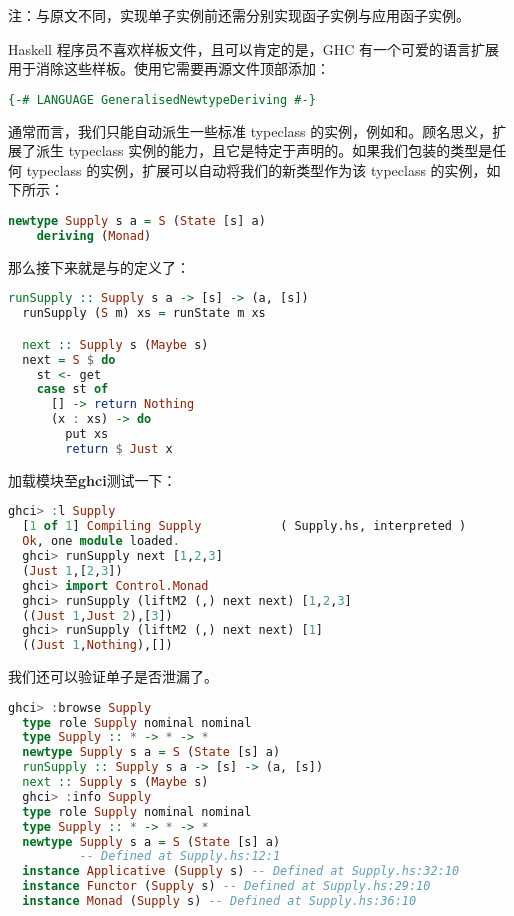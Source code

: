 \documentclass[./main.tex]{subfiles}
\begin{document}
注：与原文不同，实现单子实例前还需分别实现函子实例与应用函子实例。

Haskell 程序员不喜欢样板文件，且可以肯定的是，GHC 有一个可爱的语言扩展用于消除这些样板。使用它需要再源文件顶部添加：

\begin{lstlisting}[language=Haskell]
  {-# LANGUAGE GeneralisedNewtypeDeriving #-}
\end{lstlisting}

通常而言，我们只能自动派生一些标准 typeclass 的实例，例如和。顾名思义，扩展了派生 typeclass
实例的能力，且它是特定于声明的。如果我们包装的类型是任何 typeclass 的实例，扩展可以自动将我们的新类型作为该 typeclass 的实例，如下所示：

\begin{lstlisting}[language=Haskell]
  newtype Supply s a = S (State [s] a)
    deriving (Monad)
\end{lstlisting}

那么接下来就是与的定义了：

\begin{lstlisting}[language=Haskell]
  runSupply :: Supply s a -> [s] -> (a, [s])
  runSupply (S m) xs = runState m xs

  next :: Supply s (Maybe s)
  next = S $ do
    st <- get
    case st of
      [] -> return Nothing
      (x : xs) -> do
        put xs
        return $ Just x
\end{lstlisting}

加载模块至\textbf{ghci}测试一下：

\begin{lstlisting}[language=Haskell]
  ghci> :l Supply
  [1 of 1] Compiling Supply           ( Supply.hs, interpreted )
  Ok, one module loaded.
  ghci> runSupply next [1,2,3]
  (Just 1,[2,3])
  ghci> import Control.Monad
  ghci> runSupply (liftM2 (,) next next) [1,2,3]
  ((Just 1,Just 2),[3])
  ghci> runSupply (liftM2 (,) next next) [1]
  ((Just 1,Nothing),[])
\end{lstlisting}

我们还可以验证单子是否泄漏了。

\begin{lstlisting}[language=Haskell]
  ghci> :browse Supply
  type role Supply nominal nominal
  type Supply :: * -> * -> *
  newtype Supply s a = S (State [s] a)
  runSupply :: Supply s a -> [s] -> (a, [s])
  next :: Supply s (Maybe s)
  ghci> :info Supply
  type role Supply nominal nominal
  type Supply :: * -> * -> *
  newtype Supply s a = S (State [s] a)
          -- Defined at Supply.hs:12:1
  instance Applicative (Supply s) -- Defined at Supply.hs:32:10
  instance Functor (Supply s) -- Defined at Supply.hs:29:10
  instance Monad (Supply s) -- Defined at Supply.hs:36:10
\end{lstlisting}
\end{document}

